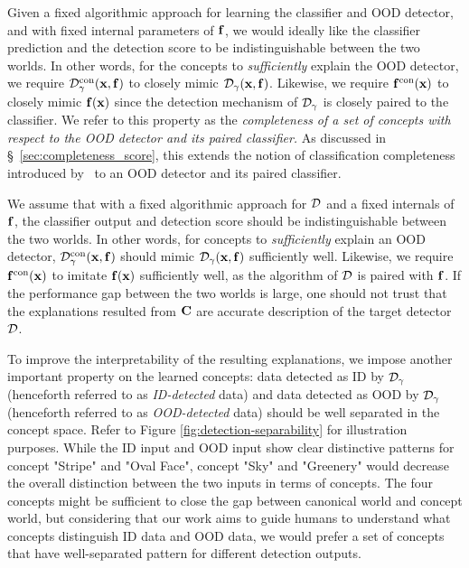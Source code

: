 %
 Given a fixed algorithmic approach for learning the classifier and OOD detector, and with fixed internal parameters of $\mathbf{f}$, we would ideally like the classifier prediction and the detection score to be indistinguishable between the two worlds. 
In other words, for the concepts to \textit{sufficiently} explain the OOD detector, we require $\mathcal{D}^{\textrm{con}}_\gamma(\mathbf{x}, \mathbf{f})$ to closely mimic $\mathcal{D}_\gamma(\mathbf{x}, \mathbf{f})$. 
Likewise, we require $\mathbf{f}^{\textrm{con}}(\mathbf{x})$ to closely mimic $\mathbf{f}(\mathbf{x})$ since the detection mechanism of $\mathcal{D}_\gamma$ is closely paired to the classifier.
We refer to this property as the {\em completeness of a set of concepts with respect to the OOD detector and its paired classifier.}  
As discussed in \S~\ref{sec:completeness_score}, this extends the notion of classification completeness introduced by~\citet{yeh2020completeness} to an OOD detector and its paired classifier.


\iffalse

We assume that with a fixed algorithmic approach for $\mathcal{D}$ and a fixed internals of $\mathbf{f}$, the classifier output and detection score should be indistinguishable between the two worlds.
In other words, for concepts to \textit{sufficiently} explain an OOD detector, $\mathcal{D}^{\textrm{con}}_\gamma(\mathbf{x}, \mathbf{f})$ should mimic $\mathcal{D}_\gamma(\mathbf{x}, \mathbf{f})$ sufficiently well. 
Likewise, we require $\mathbf{f}^{\textrm{con}}(\mathbf{x})$ to imitate $\mathbf{f}(\mathbf{x})$ sufficiently well, as the algorithm of $\mathcal{D}$ is paired with $\mathbf{f}$.
If the performance gap between the two worlds is large, one should not trust that the explanations resulted from $\mathbf{C}$ are accurate description of the target detector $\mathcal{D}$.

To improve the interpretability of the resulting explanations, we impose another important property on the learned concepts: data detected as ID by $\mathcal{D}_\gamma$ (henceforth referred to as \textit{ID-detected} data) and data detected as OOD by $\mathcal{D}_\gamma$ (henceforth referred to as \textit{OOD-detected} data) should be well separated in the concept space.
Refer to Figure \ref{fig:detection-separability} for illustration purposes.
While the ID input and OOD input show clear distinctive patterns for concept "Stripe" and "Oval Face", concept "Sky" and "Greenery" would decrease the overall distinction between the two inputs in terms of concepts. 
The four concepts might be sufficient to close the gap between canonical world and concept world, but considering that our work aims to guide humans to understand what concepts distinguish ID data and OOD data, we would prefer a set of concepts that have well-separated pattern for different detection outputs.

